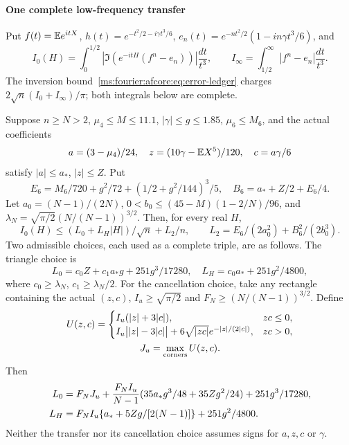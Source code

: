 \paragraph{One complete low-frequency transfer}
Put $f(t)=\mathbb E e^{itX}$, $h(t)=e^{-t^2/2-i\gamma t^3/6}$,
$e_n(t)=e^{-nt^2/2}(1-in\gamma t^3/6)$, and
\[
 I_0(H)=\int_0^{1/2}|\Im(e^{-itH}(f^n-e_n))|\frac{dt}{t^3},\qquad
 I_\infty=\int_{1/2}^\infty|f^n-e_n|\frac{dt}{t^3}.
\]
The inversion bound~\eqref{ms:fourier:afcore:eq:error-ledger} charges
$2\sqrt n(I_0+I_\infty)/\pi$; both integrals below are complete.

\begin{lemma}\label{ms:fourier:rescore:fourier-early-low}
\label{ms:fourier:rescore:fourier-paired-low}\label{ms:fourier:rescore:entryleap-fourier-transfer}
Suppose $n\ge N>2$, $\mu_4\le M\le11.1$, $|\gamma|\le g\le1.85$,
$\mu_6\le M_6$, and the actual coefficients
\[
 a=(3-\mu_4)/24,\quad z=(10\gamma-\mathbb E X^5)/120,\quad c=a\gamma/6
\]
satisfy $|a|\le a_*$, $|z|\le Z$. Put
\begin{equation}\label{ms:fourier:rescore:fourier-taylor}
 E_6=M_6/720+g^2/72+(1/2+g^2/144)^3/5,\quad
 B_6=a_*+Z/2+E_6/4.
\end{equation}
Let $a_0=(N-1)/(2N)$,
$0<b_0\le(45-M)(1-2/N)/96$, and
$\lambda_N=\sqrt{\pi/2}(N/(N-1))^{3/2}$.
Then, for every real $H$,
\begin{equation}\label{ms:fourier:rescore:fourier-low-form}
 I_0(H)\le(L_0+L_H|H|)/\sqrt n+L_2/n,
 \qquad L_2=E_6/(2a_0^2)+B_6^2/(2b_0^3).
\end{equation}
Two admissible choices, each used as a complete triple, are as follows.
The triangle choice is
\begin{equation}\label{ms:fourier:rescore:fourier-early}
 L_0=c_0Z+c_1a_*g+251g^3/17280,\quad
 L_H=c_0a_*+251g^2/4800,
\end{equation}
where $c_0\ge\lambda_N$, $c_1\ge\lambda_N/2$.
For the cancellation choice, take any rectangle containing the actual
$(z,c)$, $I_u\ge\sqrt{\pi/2}$ and $F_N\ge(N/(N-1))^{3/2}$. Define
\begin{gather*}
 U(z,c)=\begin{cases}
 I_u(|z|+3|c|),&zc\le0,\\
 I_u\bigl||z|-3|c|\bigr|+6\sqrt{|zc|}e^{-|z|/(2|c|)},&zc>0,
 \end{cases}\\
 J_u=\max_{\rm corners}U(z,c).
\end{gather*}
Then
\begin{align}\label{ms:fourier:rescore:fourier-paired}
 L_0&=F_NJ_u+\frac{F_NI_u}{N-1}
 (35a_*g^3/48+35Zg^2/24)+251g^3/17280,\notag\\
 L_H&=F_NI_u\{a_*+5Zg/[2(N-1)]\}+251g^2/4800.
\end{align}
Neither the transfer nor its cancellation choice assumes signs for
$a,z,c$ or $\gamma$.
\end{lemma}
